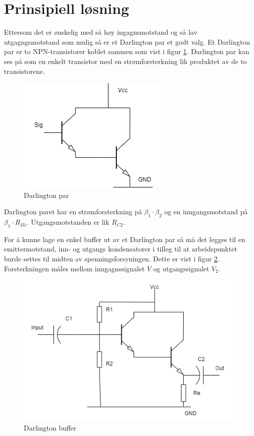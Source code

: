 \newpage
\section{Prinsipiell løsning}
\label{prinsipiellLoesning}

Ettersom det er ønskelig med så høy ingagnsmotstand og så lav utgagngsmotstand som mulig så er et Darlington par et godt valg. Et Darlington par er to NPN-transistorer koblet sammen som vist i figur \ref{fig:Darlington_basic}. Darlington par kan ses på som en enkelt transistor med en strømforsterkning lik produktet av de to transistorene.

\begin{figure}[H]
\centering
\includegraphics[scale=0.5]{bilder/Darlington_basic.drawio.png}
\caption{Darlington par}
\label{fig:Darlington_basic}
\end{figure}

Darlington paret har en strømforsterkning på $\beta_1 \cdot \beta_2$ og en inngangsmotstand på $\beta_1 \cdot R_{B1}$. Utgangsmotstanden er lik $R_{C2}$.

For å kunne lage en enkel buffer ut av et Darlington par så må det legges til en emittermotstand, inn- og utgangs kondensatorer i tilleg til at arbeidspunktet burde settes til midten av spenningsforsyningen. Dette er vist i figur \ref{fig:Darlington_buffer}. Forsterkningen måles mellom inngagnssignalet $V$ og utgangssignalet $V_2$.

\begin{figure}[H]
\centering
\includegraphics[scale=0.8]{bilder/Darlington_buffer.drawio.png}
\caption{Darlington buffer}
\label{fig:Darlington_buffer}
\end{figure}



